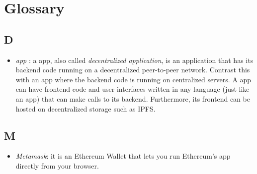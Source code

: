 \newpage
\section*{Glossary}

\subsection*{D}
\begin{itemize}
	\item \emph{\DH app }: a \DH app, also called \emph{decentralized application}, is an application that has its backend code running on a decentralized peer-to-peer network. Contrast this with an app where the backend code is running on centralized servers. A \DH app can have frontend code and user interfaces written in any language (just like an app) that can make calls to its backend. Furthermore, its frontend can be hosted on decentralized storage such as IPFS.	
\end{itemize}

\subsection*{M}
\begin{itemize}
\item \emph{Metamask}: it is an Ethereum Wallet that lets you run Ethereum's \DH app directly from your browser.
\end{itemize}